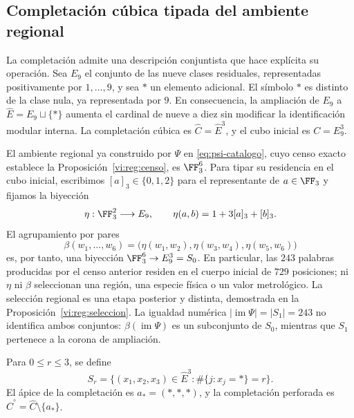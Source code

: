 \subsection{Completación cúbica tipada del ambiente regional}
\label{vi:cubo:completacion}

La completación admite una descripción conjuntista que hace explícita su
operación. Sea \(E_9\) el conjunto de las nueve clases residuales, representadas
positivamente por \(1,\ldots,9\), y sea \(\ast\) un elemento adicional.
El símbolo \(\ast\) es distinto de la clase nula, ya representada por \(9\).
En consecuencia, la ampliación de \(E_9\) a
\(\widehat E=E_9\sqcup\{\ast\}\) aumenta el cardinal de nueve a diez
sin modificar la identificación modular interna. La completación cúbica es
\(\widehat C=\widehat E^3\), y el cubo inicial es \(C=E_9^3\).

El ambiente regional ya construido por \(\Psi\) en
\eqref{eq:psi-catalogo}, cuyo censo exacto establece la
Proposición~\ref{vi:reg:censo}, es \(\FF_3^6\). Para tipar su residencia
en el cubo inicial, escribimos \([a]_3\in\{0,1,2\}\)
para el representante de \(a\in\FF_3\) y fijamos la biyección
\[
 \eta:\FF_3^2\longrightarrow E_9,
 \qquad \eta(a,b)=1+3[a]_3+[b]_3.
\]
El agrupamiento por pares
\begin{equation}
 \beta(w_1,\ldots,w_6)=
 \bigl(\eta(w_1,w_2),\eta(w_3,w_4),\eta(w_5,w_6)\bigr)
 \label{vi:cubo:beta}
\end{equation}
es, por tanto, una biyección \(\FF_3^6\to E_9^3=S_0\). En particular,
las \(243\) palabras producidas por el censo anterior residen en el cuerpo
inicial de \(729\) posiciones; ni \(\eta\) ni \(\beta\) seleccionan una
región, una especie física o un valor metrológico. La selección regional
es una etapa posterior y distinta, demostrada en la
Proposición~\ref{vi:reg:seleccion}. La igualdad numérica
\(|\operatorname{im}\Psi|=|S_1|=243\) no identifica ambos conjuntos:
\(\beta(\operatorname{im}\Psi)\) es un subconjunto de \(S_0\), mientras
que \(S_1\) pertenece a la corona de ampliación.



\begin{definition}
Para \(0\leq r\leq3\), se define
\[
 S_r=\{(x_1,x_2,x_3)\in\widehat E^3:
             \#\{j:x_j=\ast\}=r\}.
\]
El ápice de la completación es \(a_\ast=(\ast,\ast,\ast)\), y la
completación perforada es \(\widehat C^{\circ}=\widehat C\setminus\{a_\ast\}\).
\end{definition}

